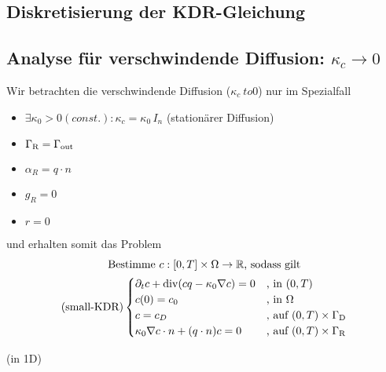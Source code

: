 \subsection{Diskretisierung der KDR-Gleichung}

\subsection{Analyse für verschwindende Diffusion: $ \kappa_c \to 0 $}
\label{Analyse für verschwindende Diffusion}
Wir betrachten die verschwindende Diffusion ($ \kappa_c \ to 0 $) nur im Spezialfall
\begin{itemize}
	\item  $ \exists \kappa_0 > 0 (const.): \kappa_c = \kappa_0 \, I_n $ (stationärer Diffusion)
	\item $ \Gamma_{\text{R}} = \Gamma_{{\text{out}}} $
	\item $ \alpha_R = q \cdot n $
	\item $ g_R = 0 $
	\item $ r = 0 $
\end{itemize}
und erhalten somit das Problem
\begin{gather*}
	\text{Bestimme }  c:[0,T] \times \Omega \to \R \text{, sodass gilt}\\
	\sDKDR\begin{cases}
		\partial_t c + \dive(c q - \kappa_0 \nabla c) = 0 &\text{, in } (0,T) \time \Omega\\
		c(0) = c_0  &\text{, in } \Omega\\
		c = c_D &\text{, auf } (0,T) \times \GammaD \\
		\kappa_0 \nabla c \cdot n + (q \cdot n) c = 0 &\text{, auf } (0,T) \times \GammaR
	\end{cases}
\end{gather*}

\begin{examples}(in 1D)
	\label{1D-Bsp}
%	
\end{examples}

